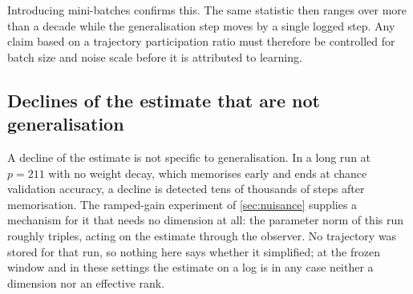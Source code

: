 \documentclass[twoside]{article}
\begin{document}
\begin{table}[H]
\centering
\caption{The full-batch statistic leaves its floor only at the longest windows. Detrended position
participation ratio in parameter space against window length, full-batch gradient descent at
$p = 97$, over all placements of the window, sixty samples per window at every length.}
\label{tab:prwindow}
\end{table}

Introducing mini-batches confirms this. The same statistic then ranges over more than a decade
while the generalisation step moves by a single logged step. Any claim based on a trajectory participation
ratio must therefore be controlled for batch size and noise scale before it is attributed to
learning.

\subsection{Declines of the estimate that are not generalisation}\label{app:falls}

A decline of the estimate is not specific to generalisation. In a long run at $p = 211$ with no
weight decay, which memorises early and ends at chance validation accuracy, a decline is detected
tens of thousands of steps after memorisation. The ramped-gain experiment of \cref{sec:nuisance}
supplies a mechanism for it that needs no dimension at all: the parameter norm of this run roughly
triples, acting on the estimate through the observer. No trajectory was stored for that run, so nothing here says
whether it simplified; at the frozen window and in these settings the estimate on a log is in any
case neither a dimension nor an effective rank.
\end{document}
